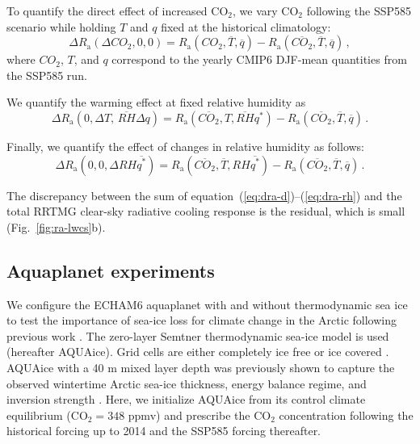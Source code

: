 \documentclass[draft]{agujournal2019}
\begin{document}
To quantify the direct effect of increased CO$_2$, we vary CO$_2$ following the SSP585 scenario while holding $T$ and $q$ fixed at the historical climatology:
\begin{equation} \label{eq:dra-d}
    \Delta R_\mathrm{a}(\Delta CO_2,0,0) = R_\mathrm{a}(CO_2, \overline{T}, \overline{q}) - R_\mathrm{a}(\overline{CO_2}, \overline{T}, \overline{q})\, ,
\end{equation}
where $CO_2$, $T$, and $q$ correspond to the yearly CMIP6 DJF-mean quantities from the SSP585 run.

We quantify the warming effect at fixed relative humidity as
\begin{equation} \label{eq:dra-t}
    \Delta R_\mathrm{a}(0,\Delta T,\,\overline{RH}\Delta q) = R_\mathrm{a}(\overline{CO_2}, T, \overline{RH}q^{\ast}) - R_\mathrm{a}(\overline{CO_2}, \overline{T}, \overline{q})\, .
\end{equation}

Finally, we quantify the effect of changes in relative humidity as follows:
\begin{equation} \label{eq:dra-rh}
    \Delta R_\mathrm{a}(0,0,\Delta RH \overline{q^\ast}) = R_\mathrm{a}(\overline{CO_2}, \overline{T}, RH \overline{q^{\ast}}) - R_\mathrm{a}(\overline{CO_2}, \overline{T}, \overline{q})\, .
\end{equation}

The discrepancy between the sum of equation~(\ref{eq:dra-d})--(\ref{eq:dra-rh}) and the total RRTMG clear-sky radiative cooling response is the residual, which is small (Fig.~\ref{fig:ra-lwcs}b).

\subsection{Aquaplanet experiments}
\label{subsec:ai-an}
We configure the ECHAM6 aquaplanet \cite<AQUA,>[]{stevens2013a} with and without thermodynamic sea ice to test the importance of sea-ice loss for climate change in the Arctic following previous work \cite{shaw2020, shaw2022}. The zero-layer Semtner thermodynamic sea-ice model \cite{semtner1976} is used (hereafter AQUAice). Grid cells are either completely ice free or ice covered \cite{giorgetta2013,salameh2018}. AQUAice with a 40 m mixed layer depth was previously shown to capture the observed wintertime Arctic sea-ice thickness, energy balance regime, and inversion strength \cite{miyawaki2022}. Here, we initialize AQUAice from its control climate equilibrium (CO$_2=348$ ppmv) and prescribe the CO$_2$ concentration following the historical forcing up to 2014 and the SSP585 forcing thereafter.
\end{document}
